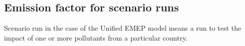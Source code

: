 % 
% 
% 

\subsection{Emission factor for scenario runs}
Scenario run in the case of the Unified EMEP model means a run to test
the impact of one or more pollutants from a particular
country. 

